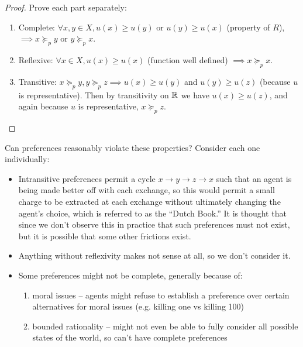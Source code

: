 \begin{proof}
  Prove each part separately:
  \begin{enumerate}
  \item Complete: $\forall x,y \in X, u(x) \geq u(y)$ or $u(y) \geq
    u(x)$ (property of $R$), $\implies x \succeq_p y$ or $y
    \succeq_p x$.
  \item Reflexive: $\forall x \in X, u(x) \geq u(x)$ (function well
    defined) $\implies x \succeq_p x$.
  \item Transitive: $x \succeq_p y, y \succeq_p z \implies u(x)
    \geq u(y)$ and $u(y) \geq u(z)$ (because $u$ is
    representative). Then by transitivity on ${\mathbb R}$ we have $u(x) \geq
    u(z)$, and again because $u$ is representative, $x \succeq_p z$.
  \end{enumerate}
\end{proof}


Can preferences reasonably violate these properties? Consider each one
individually:
\begin{itemize}
\item Intransitive preferences permit a cycle $x \to y \to z \to x$
  such that an agent is being made better off with each exchange, so
  this would permit a small charge to be extracted at each exchange
  without ultimately changing the agent's choice, which is referred to
  as the ``Dutch Book.'' It is thought that since we don't observe
  this in practice that such preferences must not exist, but it is
  possible that some other frictions exist.
\item Anything without reflexivity makes not sense at all, so we don't
  consider it.
\item Some preferences might not be complete, generally because of:
  \begin{enumerate}
  \item moral issues -- agents might refuse to establish a preference
    over certain alternatives for moral issues (e.g. killing one vs
    killing 100)
  \item bounded rationality -- might not even be able to fully
    consider all possible states of the world, so can't have complete
    preferences
  \end{enumerate}
\end{itemize}


